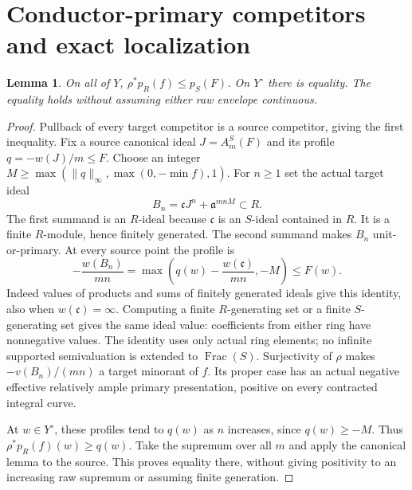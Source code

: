 \documentclass[11pt]{article}
\newtheorem{lemma}[theorem]{Lemma}
\newcommand{\aa}{\mathfrak a}
\begin{document}
\section{Conductor-primary competitors and exact localization}
\begin{lemma}\label{local}
On all of $Y$, $\rho^*p_R(f)\le p_S(F)$. On $Y^\circ$ there is equality.
The equality holds without assuming either raw envelope continuous.
\end{lemma}
\begin{proof}
Pullback of every target competitor is a source competitor, giving the
first inequality. Fix a source canonical ideal $J=A_m^S(F)$ and its
profile $q=-w(J)/m\le F$. Choose an integer
$M\ge\max(\|q\|_\infty,\max(0,-\min f),1)$.
For $n\ge1$ set the actual target ideal
\[
 B_n=\mathfrak c J^n+\aa^{mnM}\subset R.
\]
The first summand is an $R$-ideal because $\mathfrak c$ is an $S$-ideal
contained in $R$. It is a finite $R$-module, hence finitely generated.
The second summand makes $B_n$ unit-or-primary. At every source point
the profile is
\[
 -\frac{w(B_n)}{mn}
 =\max\left(q(w)-\frac{w(\mathfrak c)}{mn},-M\right)\le F(w).
\]
Indeed values of products and sums of finitely generated ideals give
this identity, also when $w(\mathfrak c)=\infty$. Computing a finite
$R$-generating set or a finite $S$-generating set gives the same ideal
value: coefficients from either ring have nonnegative values.
The identity uses only actual ring elements; no infinite supported
semivaluation is extended to $\operatorname{Frac}(S)$.
Surjectivity of $\rho$ makes $-v(B_n)/(mn)$ a target minorant of $f$.
Its proper case has an actual negative effective relatively ample
primary presentation, positive on every contracted integral curve.

At $w\in Y^\circ$, these profiles tend to $q(w)$ as $n$ increases,
since $q(w)\ge-M$. Thus $\rho^*p_R(f)(w)\ge q(w)$.
Take the supremum over all $m$ and apply the canonical lemma to the
source. This proves equality there, without giving positivity to an
increasing raw supremum or assuming finite generation.
\end{proof}
\end{document}
